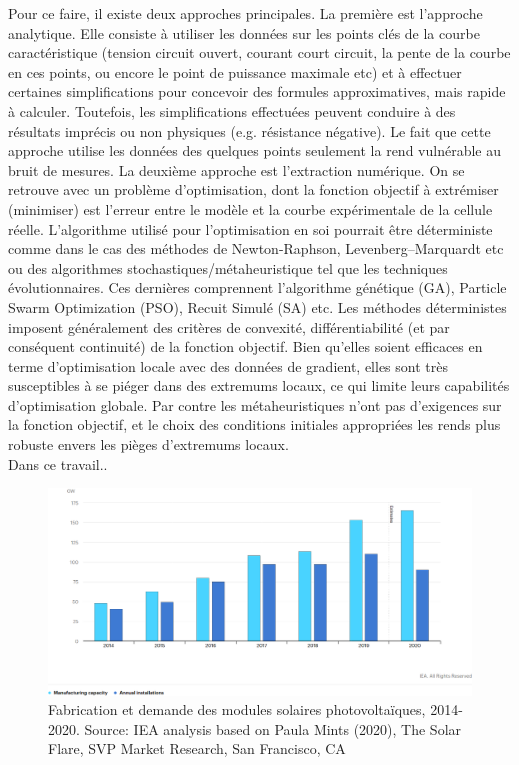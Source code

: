 Pour ce faire, il existe deux approches principales. La première est l'approche analytique. Elle consiste à utiliser les données sur les points clés de la courbe caractéristique (tension circuit ouvert, courant court circuit, la pente de la courbe en ces points, ou encore le point de puissance maximale etc) et à effectuer certaines simplifications pour concevoir des formules approximatives, mais rapide à calculer. Toutefois, les simplifications effectuées peuvent conduire à des résultats imprécis ou non physiques (e.g. résistance négative). Le fait que cette approche utilise les données des quelques points seulement la rend vulnérable au bruit de mesures. La deuxième approche est l'extraction numérique. On se retrouve avec un problème d'optimisation, dont la fonction objectif à extrémiser (minimiser) est l'erreur entre le modèle et la courbe expérimentale de la cellule réelle. L'algorithme utilisé pour l'optimisation en soi pourrait être déterministe comme dans le cas des méthodes de Newton-Raphson, Levenberg–Marquardt etc ou des algorithmes stochastiques/métaheuristique tel que les techniques évolutionnaires. Ces dernières comprennent l'algorithme génétique (GA), Particle Swarm Optimization (PSO), Recuit Simulé (SA) etc. Les méthodes déterministes imposent généralement des critères de convexité, différentiabilité (et par conséquent continuité) de la fonction objectif. Bien qu'elles soient efficaces en terme d'optimisation locale avec des données de gradient, elles sont très susceptibles à se piéger dans des extremums locaux, ce qui limite leurs capabilités d'optimisation globale. Par contre les métaheuristiques n'ont pas d'exigences sur la fonction objectif, et le choix des conditions initiales appropriées les rends plus robuste envers les pièges d'extremums locaux.\\
Dans ce travail..
\begin{figure}
  \begin{center}
    \includegraphics[width=\textwidth]{resources/ieapv.png}
    \caption{Fabrication et demande des modules solaires photovoltaïques, 2014-2020. Source: IEA analysis based on Paula Mints (2020), The Solar Flare, SVP Market Research, San Francisco, CA \cite{iea2020}}
    \label{fig:ieapv}
  \end{center}
\end{figure}
